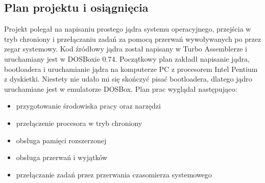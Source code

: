 \documentclass[a4paper,12pt]{article}
\begin{document}
		\subsection{Plan projektu i osiągnięcia}
		Projekt polegał na napisaniu prostego jądra systemu operacyjnego, przejścia w tryb chroniony i przełączaniu zadań za pomocą przerwań wywoływanych po przez zegar systemowy. Kod źródłowy jądra został napisany w Turbo Assemblerze i uruchamiany jest w DOSBoxie 0.74. Początkowy plan zakładł napisanie jądra, bootloadera i uruchamianie jądra na komputerze PC z procesorem Intel Pentium z dyskietki. Niestety nie udało mi się skończyć pisać bootloadera, dlatego jądro uruchamiane jest w emulatorze DOSBox. Plan prac wyglądał następująco:
			\begin{itemize}
				\item{przygotowanie środowiska pracy oraz narzędzi}
				\item{przełączenie procesora w tryb chroniony}
				\item{obsługa pamięci rozszerzonej}
				\item{obsługa przerwań i wyjątków}
				\item{przełączanie zadań przez przerwania czasomierza systemowego}	
			\end{itemize}
\end{document}
